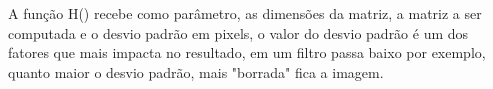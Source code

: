 A função H() recebe como parâmetro, as dimensões da matriz, a matriz a ser computada e o desvio padrão em pixels, o valor do desvio padrão é um dos fatores que mais impacta no resultado, em um filtro passa baixo por exemplo, quanto maior o desvio padrão, mais "borrada" fica a imagem.





